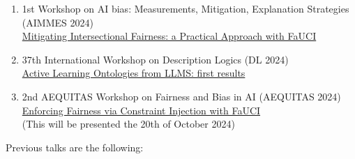 \documentclass[11pt]{article}
\begin{document}
\begin{enumerate}
	\item 1st Workshop on AI bias: Measurements, Mitigation, Explanation Strategies (AIMMES 2024)
	\\\href{https://apice.unibo.it/xwiki/bin/view/Talk/IntersectionalityAimmes2024}{Mitigating Intersectional Fairness: a Practical Approach with FaUCI}
	\item 37th International Workshop on Description Logics (DL 2024)
	\\\href{https://dl2024.w.uib.no/overview/}{Active Learning Ontologies from LLMS: first results}
	\item 2nd AEQUITAS Workshop on Fairness and Bias in AI (AEQUITAS 2024)
	\\\href{https://aequitas-aod.github.io/aequitas-ecai24.github.io/}{Enforcing Fairness via Constraint Injection with FaUCI}
	\\(This will be presented the 20th of October 2024)
\end{enumerate}

Previous talks are the following:
\end{document}
